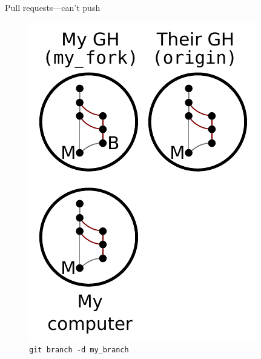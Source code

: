 \begin{frame}{Pull requests---can't push}
  \begin{figure}
    \includegraphics{fork_017.pdf}
    \\ \texttt{git branch -d my\_branch}
    \\ \texttt{}
  \end{figure}
\end{frame}

